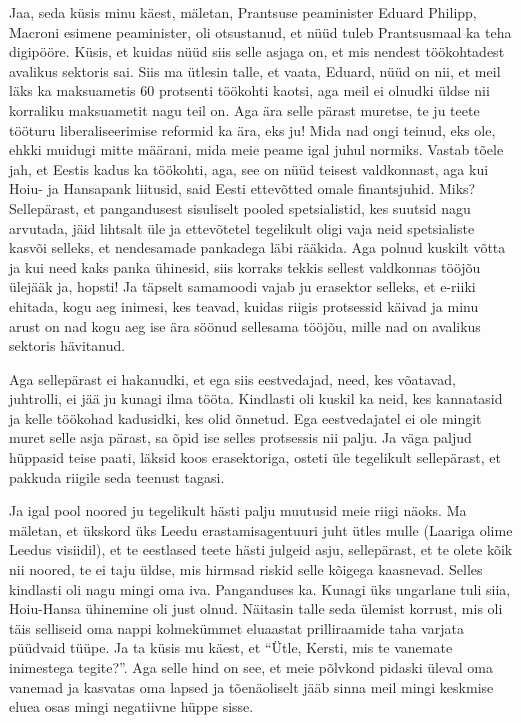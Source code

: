 Jaa, seda küsis minu käest, mäletan, Prantsuse peaminister Eduard Philipp, 
Macroni esimene peaminister, oli otsustanud, et nüüd tuleb Prantsusmaal ka teha 
digipööre. Küsis, et kuidas nüüd siis selle asjaga on, et mis nendest 
töökohtadest avalikus sektoris sai. Siis ma ütlesin talle, et vaata, Eduard, 
nüüd on nii, et meil läks ka maksuametis 60 protsenti töökohti kaotsi, aga meil 
ei olnudki üldse nii korraliku maksuametit nagu teil on. Aga ära selle pärast 
muretse, te ju teete tööturu liberaliseerimise reformid ka ära, eks ju! Mida 
nad ongi teinud, eks ole, ehkki muidugi mitte määrani, mida meie peame igal 
juhul normiks. Vastab tõele jah, et Eestis kadus ka töökohti, aga, see on nüüd 
teisest valdkonnast, aga kui Hoiu- ja Hansapank liitusid, said Eesti ettevõtted omale finantsjuhid. Miks? Sellepärast, 
et pangandusest sisuliselt pooled spetsialistid, kes suutsid nagu arvutada, 
jäid lihtsalt üle ja ettevõtetel tegelikult oligi vaja neid spetsialiste kasvõi 
selleks, et nendesamade pankadega läbi rääkida. Aga polnud kuskilt võtta ja kui 
need kaks panka ühinesid, siis korraks tekkis sellest valdkonnas tööjõu ülejääk 
ja, hopsti! Ja täpselt samamoodi vajab ju erasektor selleks, et e-riiki 
ehitada, kogu aeg inimesi, kes teavad, kuidas riigis protsessid käivad ja minu 
arust on nad kogu aeg ise ära söönud sellesama tööjõu, mille nad on avalikus 
sektoris hävitanud.


Aga sellepärast ei hakanudki, et ega siis eestvedajad, need, kes võatavad, 
juhtrolli, ei jää ju kunagi ilma tööta. Kindlasti oli kuskil ka neid, kes 
kannatasid ja kelle töökohad kadusidki, kes olid õnnetud. Ega eestvedajatel ei 
ole mingit muret selle asja pärast, sa õpid ise selles protsessis nii palju. Ja 
väga paljud hüppasid teise paati, läksid koos erasektoriga, osteti üle 
tegelikult sellepärast, et  pakkuda riigile seda teenust tagasi.


Ja igal pool noored ju tegelikult hästi palju muutusid meie riigi näoks. Ma 
mäletan, et ükskord üks Leedu erastamisagentuuri juht ütles mulle (Laariga 
olime Leedus visiidil), et te eestlased teete hästi julgeid asju, sellepärast, 
et te olete kõik nii noored, te ei taju üldse, mis hirmsad riskid selle kõigega 
kaasnevad. Selles kindlasti oli nagu mingi oma iva. Panganduses ka. Kunagi üks 
ungarlane tuli siia, Hoiu-Hansa ühinemine oli just olnud. Näitasin talle seda 
ülemist korrust, mis oli täis selliseid oma nappi kolmekümmet eluaastat 
prilliraamide taha varjata püüdvaid tüüpe. Ja ta küsis mu käest, et 
\enquote{Ütle, Kersti, mis te vanemate inimestega tegite?}. Aga selle hind on 
see, et meie põlvkond pidaski üleval oma vanemad ja kasvatas oma lapsed ja 
tõenäoliselt jääb sinna meil mingi keskmise eluea osas mingi negatiivne hüppe 
sisse.


